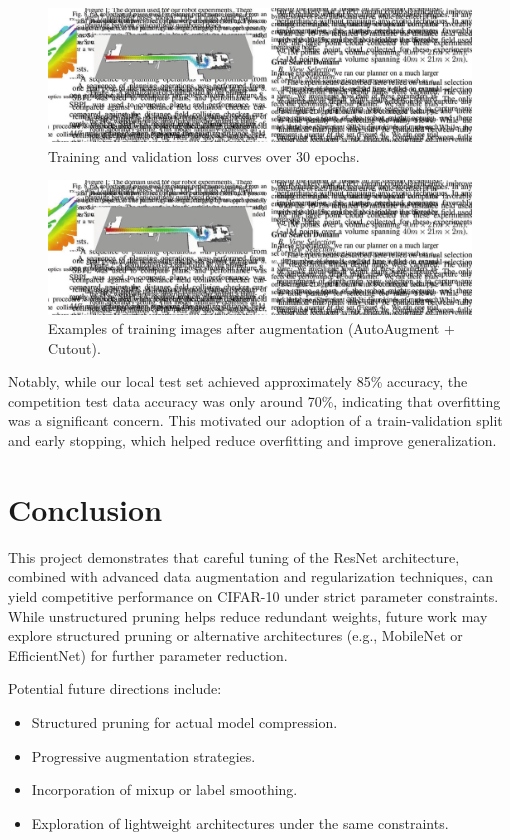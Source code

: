 \documentclass[letterpaper]{article} %
\begin{document}
\begin{figure}[h]
\centering
\includegraphics[width=0.9\linewidth]{AuthorKit24-4/CameraReady/LaTeX/figure2.pdf}
\caption{Training and validation loss curves over 30 epochs.}
\end{figure}

\begin{figure}[h]
\centering
\includegraphics[width=0.9\linewidth]{AuthorKit24-4/CameraReady/LaTeX/figure2.pdf}
\caption{Examples of training images after augmentation (AutoAugment + Cutout).}
\end{figure}

Notably, while our local test set achieved approximately 85\% accuracy, the competition test data accuracy was only around 70\%, indicating that overfitting was a significant concern. This motivated our adoption of a train-validation split and early stopping, which helped reduce overfitting and improve generalization.

\section{Conclusion}
This project demonstrates that careful tuning of the ResNet architecture, combined with advanced data augmentation and regularization techniques, can yield competitive performance on CIFAR-10 under strict parameter constraints. While unstructured pruning helps reduce redundant weights, future work may explore structured pruning or alternative architectures (e.g., MobileNet or EfficientNet) for further parameter reduction.

Potential future directions include:
\begin{itemize}
    \item Structured pruning for actual model compression.
    \item Progressive augmentation strategies.
    \item Incorporation of mixup or label smoothing.
    \item Exploration of lightweight architectures under the same constraints.
\end{itemize}



\end{document}
